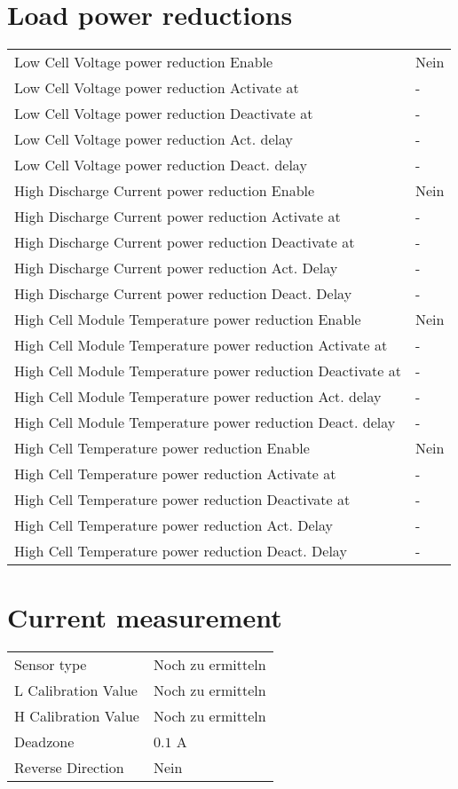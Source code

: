 \section*{Load power reductions}
\begin{tabular}{p{11cm}p{2cm}}
	Low Cell Voltage power reduction Enable & Nein \\
	Low Cell Voltage power reduction Activate at & - \\
	Low Cell Voltage power reduction Deactivate at & - \\
	Low Cell Voltage power reduction Act. delay & - \\
	Low Cell Voltage power reduction Deact. delay & - \\
	High Discharge Current power reduction Enable & Nein \\
	High Discharge Current power reduction Activate at & - \\
	High Discharge Current power reduction Deactivate at & - \\
	High Discharge Current power reduction Act. Delay & - \\
	High Discharge Current power reduction Deact. Delay & - \\
	High Cell Module Temperature power reduction Enable & Nein \\
	High Cell Module Temperature power reduction Activate at & - \\
	High Cell Module Temperature power reduction Deactivate at & - \\
	High Cell Module Temperature power reduction Act. delay & - \\
	High Cell Module Temperature power reduction Deact. delay & - \\
	High Cell Temperature power reduction Enable & Nein \\
	High Cell Temperature power reduction Activate at & - \\
	High Cell Temperature power reduction Deactivate at & - \\
	High Cell Temperature power reduction Act. Delay & - \\
	High Cell Temperature power reduction Deact. Delay & - \\
\end{tabular}

\section*{Current measurement}
\begin{tabular}{p{11cm}p{2cm}}
	Sensor type & Noch zu ermitteln \\
	L Calibration Value & Noch zu ermitteln \\
	H Calibration Value & Noch zu ermitteln \\
	Deadzone & $0.1$ A \\
	Reverse Direction & Nein
\end{tabular}

